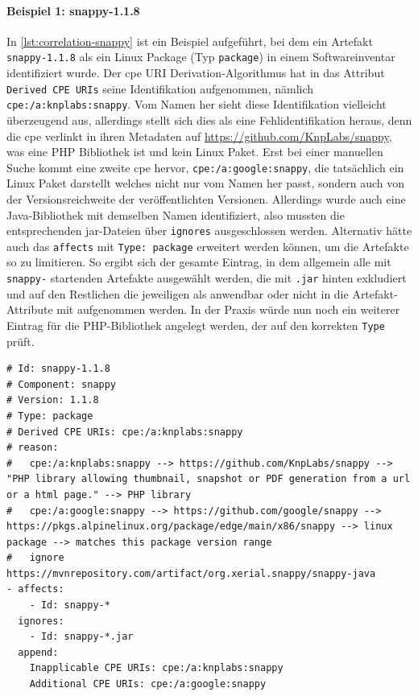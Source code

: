 \paragraph{Beispiel 1: snappy-1.1.8}
In \autoref{lst:correlation-snappy} ist ein Beispiel aufgeführt, bei dem ein Artefakt \texttt{snappy-1.1.8} als ein Linux Package (Typ \texttt{package}) in einem Softwareinventar identifiziert wurde.
Der \acrshort{cpe} URI Derivation-Algorithmus hat in das Attribut \texttt{Derived CPE URIs} seine Identifikation aufgenommen, nämlich \texttt{cpe:/a:knplabs:snappy}.
Vom Namen her sieht diese Identifikation vielleicht überzeugend aus, allerdings stellt sich dies als eine Fehlidentifikation heraus, denn die \acrshort{cpe} verlinkt in ihren Metadaten auf \url{https://github.com/KnpLabs/snappy}, was eine PHP Bibliothek ist und kein Linux Paket.
Erst bei einer manuellen Suche kommt eine zweite \acrshort{cpe} hervor, \texttt{cpe:/a:google:snappy}, die tatsächlich ein Linux Paket darstellt welches nicht nur vom Namen her passt, sondern auch von der Versionsreichweite der veröffentlichten Versionen.
Allerdings wurde auch eine Java-Bibliothek mit demselben Namen identifiziert, also mussten die entsprechenden jar-Dateien über \texttt{ignores} ausgeschlossen werden.
Alternativ hätte auch das \texttt{affects} mit \texttt{Type: package} erweitert werden können, um die Artefakte so zu limitieren.
So ergibt sich der gesamte Eintrag, in dem allgemein alle mit \texttt{snappy-} startenden Artefakte ausgewählt werden, die mit \texttt{.jar} hinten exkludiert und auf den Restlichen die jeweiligen  als anwendbar oder nicht in die Artefakt-Attribute mit aufgenommen werden.
In der Praxis würde nun noch ein weiterer Eintrag für die PHP-Bibliothek angelegt werden, der auf den korrekten \texttt{Type} prüft.

\begin{lstlisting}[style=yaml,caption={Korrelationseintrag für Snappy-Komponenten},label={lst:correlation-snappy}]
# Id: snappy-1.1.8
# Component: snappy
# Version: 1.1.8
# Type: package
# Derived CPE URIs: cpe:/a:knplabs:snappy
# reason:
#   cpe:/a:knplabs:snappy --> https://github.com/KnpLabs/snappy --> "PHP library allowing thumbnail, snapshot or PDF generation from a url or a html page." --> PHP library
#   cpe:/a:google:snappy --> https://github.com/google/snappy --> https://pkgs.alpinelinux.org/package/edge/main/x86/snappy --> linux package --> matches this package version range
#   ignore https://mvnrepository.com/artifact/org.xerial.snappy/snappy-java
- affects:
    - Id: snappy-*
  ignores:
    - Id: snappy-*.jar
  append:
    Inapplicable CPE URIs: cpe:/a:knplabs:snappy
    Additional CPE URIs: cpe:/a:google:snappy
\end{lstlisting}

